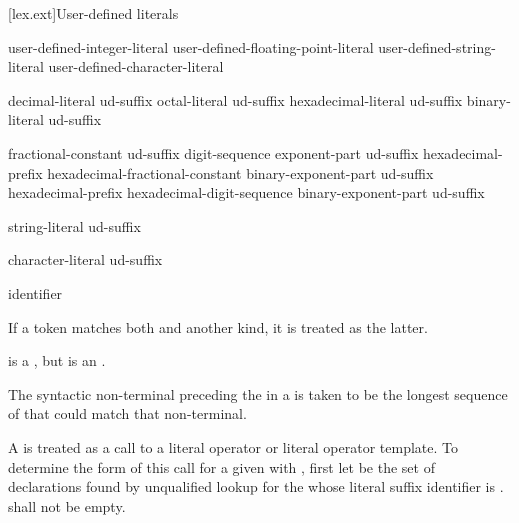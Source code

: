 \documentclass{wg21}
\begin{document}
[lex.ext]{User-defined literals}

%
\begin{bnf}
    \br
    user-defined-integer-literal\br
    user-defined-floating-point-literal\br
    user-defined-string-literal\br
    user-defined-character-literal
\end{bnf}

\begin{bnf}
    \br
    decimal-literal ud-suffix\br
    octal-literal ud-suffix\br
    hexadecimal-literal ud-suffix\br
    binary-literal ud-suffix
\end{bnf}

\begin{bnf}
    \br
    fractional-constant  ud-suffix\br
    digit-sequence exponent-part ud-suffix\br
    hexadecimal-prefix hexadecimal-fractional-constant binary-exponent-part ud-suffix\br
    hexadecimal-prefix hexadecimal-digit-sequence binary-exponent-part ud-suffix
\end{bnf}

\begin{bnf}
    \br
    string-literal ud-suffix
\end{bnf}

\begin{bnf}
    \br
    character-literal ud-suffix
\end{bnf}

\begin{bnf}
    \br
    identifier
\end{bnf}

\pnum
If a token matches both  and another  kind, it
is treated as the latter.
\begin{example}
    is a , but  is an
    .
\end{example}
The syntactic non-terminal preceding the  in a
 is taken to be the longest sequence of
 that could match that non-terminal.

\pnum
A  is treated as a call to a literal operator or
literal operator template.
To determine the form of this call for
a given  
with  ,
first let  be the set of declarations
found by unqualified lookup for the 
whose literal suffix identifier is .
 shall not be empty.
\end{document}
